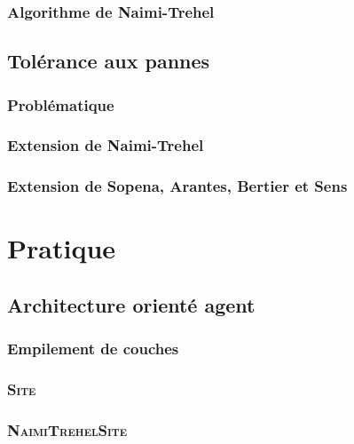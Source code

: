 \documentclass[a4paper,french,towsides,10pt]{book}
\begin{document}
\subsection{Algorithme de Naimi-Trehel}


\section{Tolérance aux pannes}
\subsection{Problématique}

\subsection{Extension de Naimi-Trehel}

\subsection{Extension de Sopena, Arantes, Bertier et Sens}


\chapter{Pratique}

\section{Architecture orienté agent}
\subsection{Empilement de couches}

\subsection{\textsc{Site}}

\subsection{\textsc{NaimiTrehelSite}}

\end{document}
